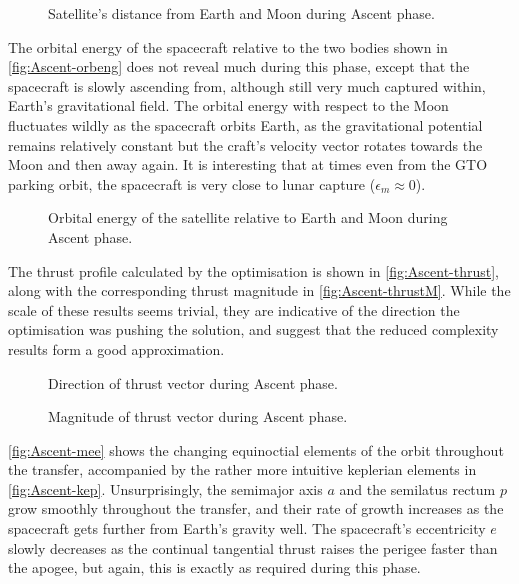 \begin{figure}
\centering
\def\svgwidth{\figurewidth}

\caption{Satellite's distance from Earth and Moon during Ascent phase.}
\label{fig:Ascent-dist}
\end{figure}

The orbital energy of the spacecraft relative to the two bodies shown in \autoref{fig:Ascent-orbeng} does not reveal much during this phase, except that the spacecraft is slowly ascending from, although still very much captured within, Earth's gravitational field. The orbital energy with respect to the Moon fluctuates wildly as the spacecraft orbits Earth, as the gravitational potential remains relatively constant but the craft's velocity vector rotates towards the Moon and then away again. It is interesting that at times even from the GTO parking orbit, the spacecraft is very close to lunar capture ($\epsilon_m\approx0$).

\begin{figure}
\centering
\def\svgwidth{\figurewidth}

\caption{Orbital energy of the satellite relative to Earth and Moon during Ascent phase.}
\label{fig:Ascent-orbeng}
\end{figure}

The thrust profile calculated by the optimisation is shown in \autoref{fig:Ascent-thrust}, along with the corresponding thrust magnitude in \autoref{fig:Ascent-thrustM}. While the scale of these results seems trivial, they are indicative of the direction the optimisation was pushing the solution, and suggest that the reduced complexity results form a good approximation. 

\begin{figure}
\centering
\def\svgwidth{\figurewidth}

\caption{Direction of thrust vector during Ascent phase.}
\label{fig:Ascent-thrust}
\end{figure}

\begin{figure}
\centering
\def\svgwidth{\figurewidth}

\caption{Magnitude of thrust vector during Ascent phase.}
\label{fig:Ascent-thrustM}
\end{figure}

\autoref{fig:Ascent-mee} shows the changing equinoctial elements of the orbit throughout the transfer, accompanied by the rather more intuitive keplerian elements in \autoref{fig:Ascent-kep}. Unsurprisingly, the semimajor axis $a$ and the semilatus rectum $p$ grow smoothly throughout the transfer, and their rate of growth increases as the spacecraft gets further from Earth's gravity well. The spacecraft's eccentricity $e$ slowly decreases as the continual tangential thrust raises the perigee faster than the apogee, but again, this is exactly as required during this phase.


